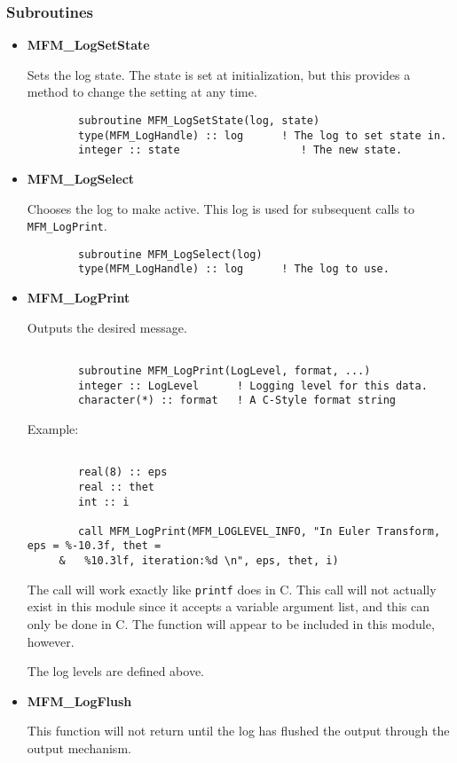 \subsubsection{Subroutines}
\begin{itemize}

\item{\bf MFM\_LogSetState}

Sets the log state.  The state is set at initialization, but this provides a
method to change the setting at any time.

\begin{verbatim}
        subroutine MFM_LogSetState(log, state)
        type(MFM_LogHandle) :: log      ! The log to set state in.
        integer :: state                   ! The new state.
\end{verbatim} 

\item{\bf MFM\_LogSelect}

Chooses the log to make active.  This log is used for subsequent calls 
to {\tt MFM\_LogPrint}.

\begin{verbatim}
        subroutine MFM_LogSelect(log)
        type(MFM_LogHandle) :: log      ! The log to use.
\end{verbatim} 

\item{\bf MFM\_LogPrint}

Outputs the desired message.

\begin{verbatim}
        
        subroutine MFM_LogPrint(LogLevel, format, ...)
        integer :: LogLevel      ! Logging level for this data.
        character(*) :: format   ! A C-Style format string        
\end{verbatim}

Example:

\begin{verbatim}

        real(8) :: eps
        real :: thet
        int :: i        

        call MFM_LogPrint(MFM_LOGLEVEL_INFO, "In Euler Transform, eps = %-10.3f, thet =
     &   %10.3lf, iteration:%d \n", eps, thet, i)

\end{verbatim}

The call will work exactly like {\tt printf} does in C.  This call will not
actually exist in this module since it accepts a variable argument list, and
this can only be done in C.  The function will appear to be included in this
module, however.

The log levels are defined above.

\item{\bf MFM\_LogFlush}
        
This function will not return until the log has flushed the output through
the output mechanism.

\end{itemize}
